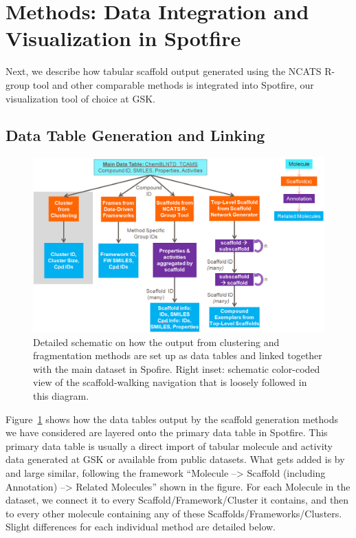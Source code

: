 \documentclass[journal=jacsat,manuscript=article]{achemso}
\newcommand*\fref[1]{Figure~\ref{fig:#1}}
\begin{document}
\section{Methods: Data Integration and Visualization in Spotfire}
\label{sec:methods2}

Next, we describe how tabular scaffold output generated using the
NCATS R-group tool and other comparable methods is integrated into
Spotfire, our visualization tool of choice at GSK.

\subsection{Data Table Generation and Linking}

\begin{figure}
\includegraphics[width=6in]{fig/details_all2.png}
\caption{Detailed schematic on how the output from clustering and fragmentation methods are set up as data tables and linked together with the main dataset in Spofire. Right inset: schematic color-coded view of the scaffold-walking navigation that is loosely followed in this diagram.}
\label{fig:detaildevil}
\end{figure}

\fref{detaildevil} shows how the data tables output by the scaffold generation methods we have considered are layered onto the primary data table in Spotfire. This primary data table is usually a direct import of tabular molecule and activity data generated at GSK or available from public datasets. What gets added is by and large similar, following the framework ``Molecule --> Scaffold (including Annotation) --> Related Molecules'' shown in the figure. For each Molecule in the dataset, we connect it to every Scaffold/Framework/Cluster it contains, and then to every other molecule containing any of these Scaffolds/Frameworks/Clusters. Slight differences for each individual method are detailed below. 
\end{document}
